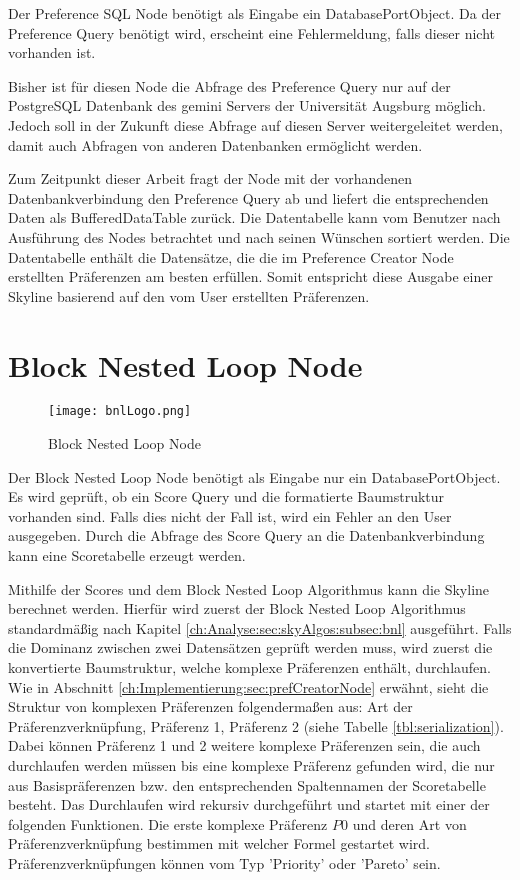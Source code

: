 Der Preference SQL Node benötigt als Eingabe ein DatabasePortObject. Da der Preference Query benötigt wird, erscheint eine Fehlermeldung, falls dieser nicht vorhanden ist.

Bisher ist für diesen Node die Abfrage des Preference Query nur auf der PostgreSQL Datenbank des gemini Servers der Universität Augsburg möglich. Jedoch soll in der Zukunft diese Abfrage auf diesen Server weitergeleitet werden, damit auch Abfragen von anderen Datenbanken ermöglicht werden.

Zum Zeitpunkt dieser Arbeit fragt der Node mit der vorhandenen Datenbankverbindung den Preference Query ab und liefert die entsprechenden Daten als BufferedDataTable zurück. Die Datentabelle kann vom Benutzer nach Ausführung des Nodes betrachtet und nach seinen Wünschen sortiert werden. Die Datentabelle enthält die Datensätze, die die im Preference Creator Node erstellten Präferenzen am besten erfüllen. Somit entspricht diese Ausgabe einer Skyline basierend auf den vom User erstellten Präferenzen.
\section{Block Nested Loop Node}
\label{ch:Implementierung:sec:bnlNode}
\begin{figure}[H]
	\centering
	\texttt{[image: bnlLogo.png]}
	\caption{Block Nested Loop Node}
	\label{img:bnlLogo}
\end{figure}

Der Block Nested Loop Node benötigt als Eingabe nur ein DatabasePortObject. Es wird geprüft, ob ein Score Query und die formatierte Baumstruktur vorhanden sind. Falls dies nicht der Fall ist, wird ein Fehler an den User ausgegeben.
Durch die Abfrage des Score Query an die Datenbankverbindung kann eine Scoretabelle erzeugt werden.

Mithilfe der Scores und dem Block Nested Loop Algorithmus kann die Skyline berechnet werden.
Hierfür wird zuerst der Block Nested Loop Algorithmus standardmäßig nach Kapitel \ref{ch:Analyse:sec:skyAlgos:subsec:bnl} ausgeführt. Falls die Dominanz zwischen zwei Datensätzen geprüft werden muss, wird zuerst die konvertierte Baumstruktur, welche komplexe Präferenzen enthält, durchlaufen.
Wie in Abschnitt \ref{ch:Implementierung:sec:prefCreatorNode} erwähnt, sieht die Struktur von komplexen Präferenzen folgendermaßen aus: Art der Präferenzverknüpfung, Präferenz 1, Präferenz 2 (siehe Tabelle \ref{tbl:serialization}).
Dabei können Präferenz 1 und 2 weitere komplexe Präferenzen sein, die auch durchlaufen werden müssen bis eine komplexe Präferenz gefunden wird, die nur aus Basispräferenzen bzw. den entsprechenden Spaltennamen der Scoretabelle besteht.
Das Durchlaufen wird rekursiv durchgeführt und startet mit einer der folgenden Funktionen. Die erste komplexe Präferenz $P0$ und deren Art von Präferenzverknüpfung bestimmen mit welcher Formel gestartet wird.
Präferenzverknüpfungen können vom Typ 'Priority' oder 'Pareto' sein.

